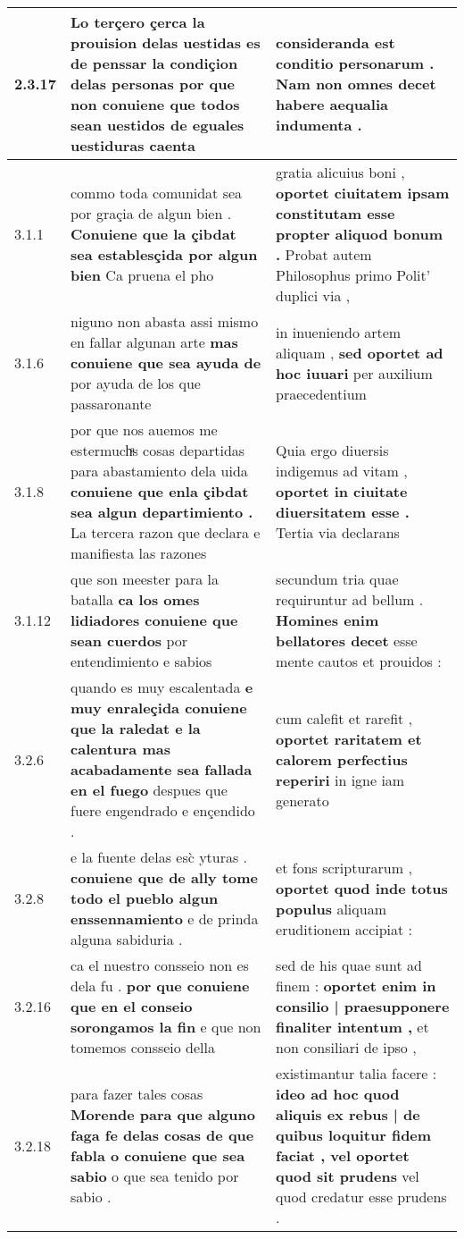 \begin{tabular}{|p{1cm}|p{6.5cm}|p{6.5cm}|}
2.3.17 & Lo terçero çerca la prouision delas uestidas es de penssar la condiçion delas personas \textbf{ por que non conuiene que todos sean uestidos } de eguales uestiduras caenta & consideranda est conditio personarum . \textbf{ Nam non omnes decet } habere aequalia indumenta . \\\hline
3.1.1 & commo toda comunidat sea por graçia de algun bien . \textbf{ Conuiene que la çibdat sea establesçida por algun bien } Ca pruena el pho & gratia alicuius boni , \textbf{ oportet ciuitatem ipsam constitutam esse propter aliquod bonum . } Probat autem Philosophus primo Polit’ duplici via , \\\hline
3.1.6 & niguno non abasta assi mismo en fallar algunan arte \textbf{ mas conuiene que sea ayuda de } por ayuda de los que passaronante & in inueniendo artem aliquam , \textbf{ sed oportet ad hoc iuuari } per auxilium praecedentium \\\hline
3.1.8 & por que nos auemos me estermuchͣs cosas departidas para abastamiento dela uida \textbf{ conuiene que enla çibdat sea algun departimiento . } La tercera razon que declara e manifiesta las razones & Quia ergo diuersis indigemus ad vitam , \textbf{ oportet in ciuitate diuersitatem esse . } Tertia via declarans \\\hline
3.1.12 & que son meester para la batalla \textbf{ ca los omes lidiadores conuiene que sean cuerdos } por entendimiento e sabios & secundum tria quae requiruntur ad bellum . \textbf{ Homines enim bellatores decet } esse mente cautos et prouidos : \\\hline
3.2.6 & quando es muy escalentada \textbf{ e muy enraleçida conuiene que la raledat e la calentura mas acabadamente sea fallada en el fuego } despues que fuere engendrado e ençendido . & cum calefit et rarefit , \textbf{ oportet raritatem et calorem perfectius reperiri } in igne iam generato \\\hline
3.2.8 & e la fuente delas esc̀ yturas . \textbf{ conuiene que de ally tome todo el pueblo algun enssennamiento } e de prinda alguna sabiduria . & et fons scripturarum , \textbf{ oportet quod inde totus populus } aliquam eruditionem accipiat : \\\hline
3.2.16 & ca el nuestro consseio non es dela fu . \textbf{ por que conuiene que en el conseio sorongamos la fin } e que non tomemos consseio della & sed de his quae sunt ad finem : \textbf{ oportet enim in consilio | praesupponere finaliter intentum , } et non consiliari de ipso , \\\hline
3.2.18 & para fazer tales cosas \textbf{ Morende para que alguno faga fe delas cosas de que fabla o conuiene que sea sabio } o que sea tenido por sabio . & existimantur talia facere : \textbf{ ideo ad hoc quod aliquis ex rebus | de quibus loquitur fidem faciat , vel oportet quod sit prudens } vel quod credatur esse prudens . \\\hline

\end{tabular}
